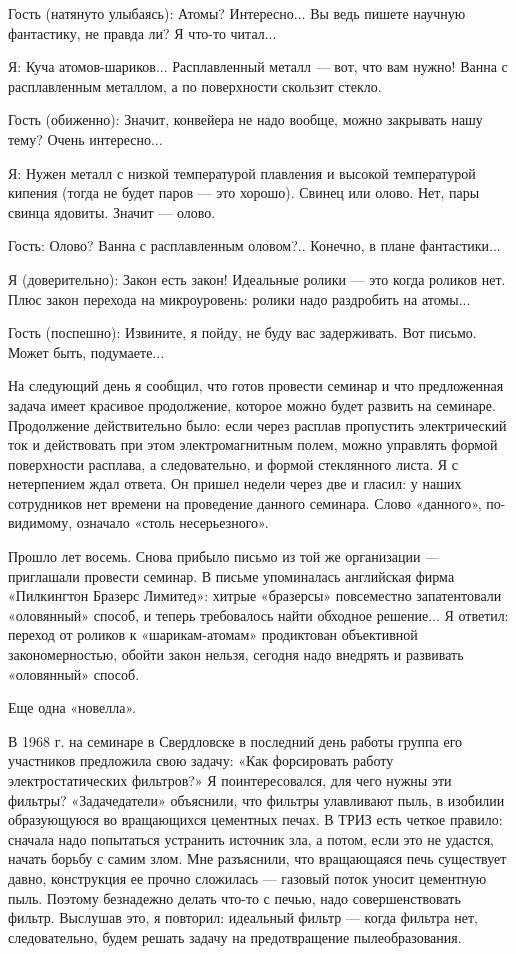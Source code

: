 Гость (натянуто улыбаясь): Атомы?  Интересно... Вы ведь пишете научную
фантастику, не правда ли? Я что-то читал...

Я: Куча атомов-шариков...  Расплавленный металл — вот,  что вам нужно!
Ванна с расплавленным металлом, а по поверхности скользит стекло.

Гость (обиженно):  Значит, конвейера  не надо вообще,  можно закрывать
нашу тему? Очень интересно...

Я: Нужен металл с низкой температурой плавления и высокой температурой
кипения (тогда  не будет паров —  это хорошо). Свинец или  олово. Нет,
пары свинца ядовиты. Значит — олово.

Гость:  Олово?  Ванна  с  расплавленным  оловом?..  Конечно,  в  плане
фантастики...

Я  (доверительно): Закон  есть  закон! Идеальные  ролики  — это  когда
роликов  нет.  Плюс  закон   перехода  на  микроуровень:  ролики  надо
раздробить на атомы...

Гость  (поспешно): Извините,  я пойду,  не буду  вас задерживать.  Вот
письмо. Может быть, подумаете...

На  следующий  день  я  сообщил,  что готов  провести  семинар  и  что
предложенная   задача  имеет   красивое  продолжение,   которое  можно
будет  развить  на  семинаре.  Продолжение  действительно  было:  если
через  расплав пропустить  электрический  ток и  действовать при  этом
электромагнитным полем, можно управлять формой поверхности расплава, а
следовательно,  и  формой  стеклянного  листа. Я  с  нетерпением  ждал
ответа. Он пришел  недели через две и гласил: у  наших сотрудников нет
времени на проведение данного  семинара. Слово «данного», по-видимому,
означало «столь несерьезного».

Прошло  лет  восемь.  Снова  прибыло  письмо  из  той  же  организации
—  приглашали  провести  семинар.   В  письме  упоминалась  английская
фирма  «Пилкингтон  Бразерс  Лимитед»: хитрые  «бразерсы»  повсеместно
запатентовали «оловянный» способ, и  теперь требовалось найти обходное
решение...   Я  ответил:   переход  от   роликов  к   «шарикам-атомам»
продиктован объективной закономерностью,  обойти закон нельзя, сегодня
надо внедрять и развивать «оловянный» способ.


Еще одна «новелла».

В 1968  г. на семинаре  в Свердловске  в последний день  работы группа
его  участников  предложила  свою   задачу:  «Как  форсировать  работу
электростатических фильтров?»  Я поинтересовался,  для чего  нужны эти
фильтры?  «Задачедатели» объяснили,  что  фильтры  улавливают пыль,  в
изобилии  образующуюся во  вращающихся  цементных печах.  В ТРИЗ  есть
четкое  правило:  сначала  надо  попытаться  устранить  источник  зла,
а  потом,  если это  не  удастся,  начать  борьбу  с самим  злом.  Мне
разъяснили,  что вращающаяся  печь  существует  давно, конструкция  ее
прочно  сложилась  —  газовый  поток уносит  цементную  пыль.  Поэтому
безнадежно  делать  что-то  с  печью,  надо  совершенствовать  фильтр.
Выслушав  это,  я повторил:  идеальный  фильтр  — когда  фильтра  нет,
следовательно, будем решать задачу на предотвращение пылеобразования.

